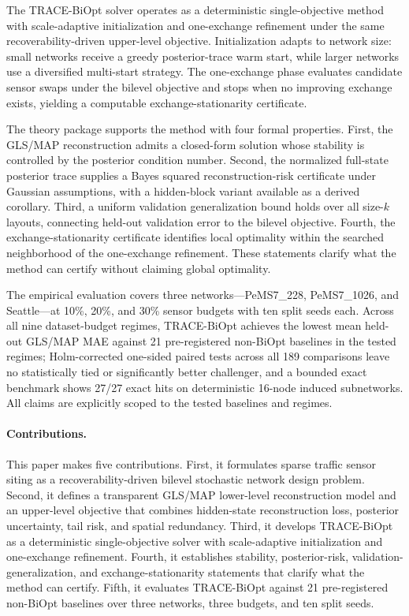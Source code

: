 The TRACE-BiOpt solver operates as a deterministic single-objective method with scale-adaptive initialization and one-exchange refinement under the same recoverability-driven upper-level objective. Initialization adapts to network size: small networks receive a greedy posterior-trace warm start, while larger networks use a diversified multi-start strategy. The one-exchange phase evaluates candidate sensor swaps under the bilevel objective and stops when no improving exchange exists, yielding a computable exchange-stationarity certificate.

The theory package supports the method with four formal properties. First, the GLS/MAP reconstruction admits a closed-form solution whose stability is controlled by the posterior condition number. Second, the normalized full-state posterior trace supplies a Bayes squared reconstruction-risk certificate under Gaussian assumptions, with a hidden-block variant available as a derived corollary. Third, a uniform validation generalization bound holds over all size-$k$ layouts, connecting held-out validation error to the bilevel objective. Fourth, the exchange-stationarity certificate identifies local optimality within the searched neighborhood of the one-exchange refinement. These statements clarify what the method can certify without claiming global optimality.

The empirical evaluation covers three networks---PeMS7\_228, PeMS7\_1026, and Seattle---at 10\%, 20\%, and 30\% sensor budgets with ten split seeds each. Across all nine dataset-budget regimes, TRACE-BiOpt achieves the lowest mean held-out GLS/MAP MAE against 21 pre-registered non-BiOpt baselines in the tested regimes; Holm-corrected one-sided paired tests across all 189 comparisons leave no statistically tied or significantly better challenger, and a bounded exact benchmark shows 27/27 exact hits on deterministic 16-node induced subnetworks. All claims are explicitly scoped to the tested baselines and regimes.

\paragraph{Contributions.}
This paper makes five contributions.
First, it formulates sparse traffic sensor siting as a recoverability-driven bilevel stochastic network design problem.
Second, it defines a transparent GLS/MAP lower-level reconstruction model and an upper-level objective that combines hidden-state reconstruction loss, posterior uncertainty, tail risk, and spatial redundancy.
Third, it develops TRACE-BiOpt as a deterministic single-objective solver with scale-adaptive initialization and one-exchange refinement.
Fourth, it establishes stability, posterior-risk, validation-generalization, and exchange-stationarity statements that clarify what the method can certify.
Fifth, it evaluates TRACE-BiOpt against 21 pre-registered non-BiOpt baselines over three networks, three budgets, and ten split seeds.

